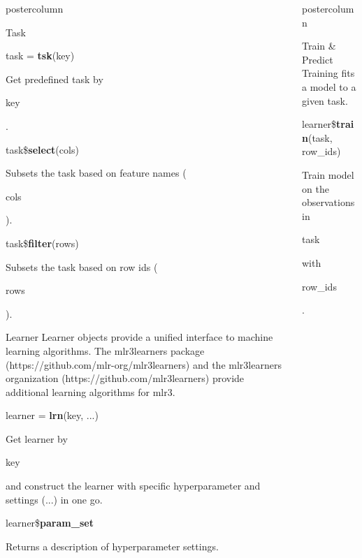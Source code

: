 \documentclass{beamer}
\newlength{\columnheight} %
\newcommand{\codeinline}[1]{\begin{codeboxinline}#1\end{codeboxinline}}
\begin{document}
\begin{frame}[fragile]{}
\begin{columns}
\begin{column}{.245\textwidth}
\begin{beamercolorbox}[center]{postercolumn}
\begin{minipage}{.98\textwidth}
{\begin{myblock}{Task}
\begin{codebox}
								task = \textbf{tsk}(key)
							\end{codebox}
							Get predefined task by \codeinline{key}.
							\\
							\begin{codebox}
								task\$\textbf{select}(cols)
							\end{codebox}
							Subsets the task based on feature names (\codeinline{cols}).
							\\
							\begin{codebox}
								task\$\textbf{filter}(rows)
							\end{codebox}
							Subsets the task based on row ids (\codeinline{rows}).
						\end{myblock}
						\begin{myblock}{Learner}
						Learner objects provide a unified interface to machine learning algorithms. The mlr3learners package (https://github.com/mlr-org/mlr3learners) and the mlr3learners organization (https://github.com/mlr3learners) provide additional learning algorithms for mlr3.
						\\
						\begin{codebox}
							learner = \textbf{lrn}(key, ...)
						\end{codebox}
						Get learner by \codeinline{key} and construct the learner with specific hyperparameter and settings (...) in one go.
						\\
						\begin{codebox}
							learner\$\textbf{param\_set}
						\end{codebox}
						Returns a description of hyperparameter settings.
					\end{myblock}
						\vfill
					}
				\end{minipage}
			\end{beamercolorbox}
		\end{column}
		\begin{column}{.245\textwidth}
			\begin{beamercolorbox}[center]{postercolumn}
				\begin{minipage}{.98\textwidth}
					\parbox[t][\columnheight]{\textwidth}{
						\begin{myblock}{Train \& Predict}
							Training fits a model to a given task.
							\\
							\begin{codebox}
								learner\$\textbf{train}(task, row\_ids)
							\end{codebox}
							Train model on the observations in \codeinline{task} with \codeinline{row\_ids}.

\end{myblock}}
\end{minipage}
\end{beamercolorbox}
\end{column}
\end{columns}
\end{frame}
\end{document}
